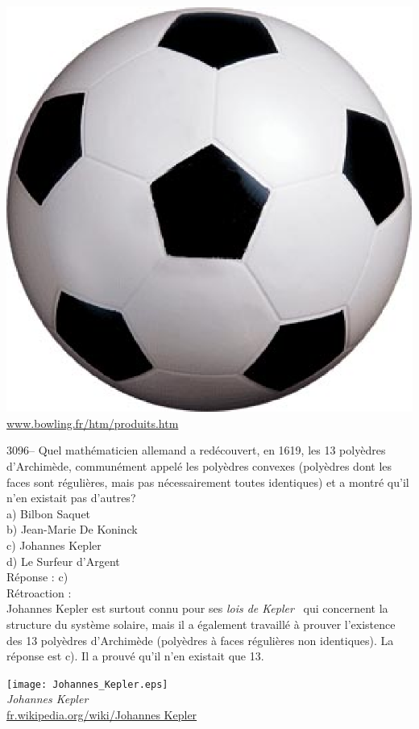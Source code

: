 \documentclass[letterpaper, 12pt]{article}
\begin{document}
\begin{center}
\includegraphics[scale=0.15]{ballon.eps}\\
\href{http://www.bowling.fr/htm/produits.htm}{www.bowling.fr/htm/produits.htm}\\[5mm]
\end{center}



3096-- Quel math\'ematicien allemand a red\'ecouvert, en 1619, les 13 poly\`edres d'Archim\`ede, commun\'ement appel\'e les poly\`edres convexes (poly\`edres dont les faces sont r\'eguli\`eres, mais pas n\'ecessairement toutes identiques) et a montr\'e qu'il n'en existait pas d'autres?\\

a) Bilbon Saquet\\
b) Jean-Marie De Koninck\\
c) Johannes Kepler\\
d) Le Surfeur d'Argent\\

R\'eponse : c)\\

R\'etroaction :\\
Johannes Kepler est surtout connu pour ses \og \emph{lois de Kepler} \fg \ qui concernent la structure du syst\`eme solaire, mais il a \'egalement travaill\'e \`a prouver l'existence des 13 poly\`edres d'Archim\`ede (poly\`edres \`a faces r\'eguli\`eres non identiques). La r\'eponse est c). Il a prouv\'e qu'il n'en existait que 13.\\
\begin{center}
\texttt{[image: Johannes\_Kepler.eps]}\\
\emph{{\small Johannes Kepler}}\\
\href{http://fr.wikipedia.org/wiki/Johannes Kepler}{fr.wikipedia.org/wiki/Johannes Kepler}\\[5mm]
\end{center}
\end{document}
